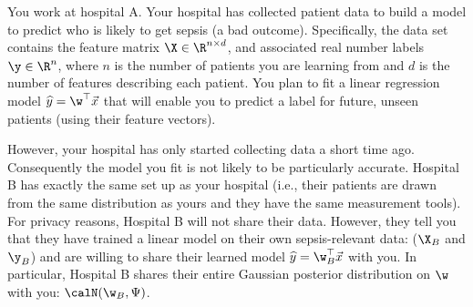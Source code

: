 \documentclass[preview]{standalone}
\begin{document}

You work at hospital A. Your hospital has collected patient data to build a model to predict who is likely to get sepsis (a bad outcome). Specifically, the data set contains the feature matrix $\X \in \R^{n \times d}$, and associated real number labels $\y \in \R ^ n$, where $n$ is the number of patients you are learning from and $d$ is the number of features describing each patient. You plan to fit a linear regression model $\widehat{y} = \w^{\top} \vec{x}$ that will enable you to predict a label for future, unseen patients (using their feature vectors).

However, your hospital has only started collecting data a short time ago. Consequently the model you fit is not likely to be particularly accurate. Hospital B has exactly the same set up as your hospital (i.e., their patients are drawn from the same distribution as yours and they have the same measurement tools). For privacy reasons, Hospital B will not share their data. However, they tell you that they have trained a linear model on their own sepsis-relevant data: ($\X_B$ and $\y_B$) and are willing to share their learned model $\widehat{y} = \w_B^{\top} \vec{x}$ with you. In particular, Hospital B shares their entire Gaussian posterior distribution on $\w$ with you: $\calN(\w_B, \Psi)$.
\end{document}
